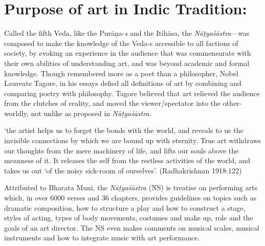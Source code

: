 \section*{Purpose of art in Indic Tradition:}

Called the fifth Veda, like the Purāṇa-\textsl{s} and the Itihāsa, the \textsl{Nāṭyaśāstra}---was composed to make the knowledge of the \hbox{Veda-s} accessible to all factions of society, by evoking an experience in the audience that was commensurate with their own abilities of understanding art, and was beyond academic and formal knowledge. Though remembered more as a poet than a philosopher, Nobel Laureate Tagore, in his essays defied all definitions of art by combining and comparing poetry with philosophy. Tagore believed that art relieved the audience from the clutches of reality, and moved the viewer/spectator into the other-worldly, not unlike as proposed in \textsl{Nāṭyaśāstra}. 

\begin{myquote}
‘the artist helps us to forget the bonds with the world, and reveals to us the invisible connections by which we are bound up with eternity. True art withdraws our thoughts from the mere machinery of life, and lifts our souls above the meanness of it. It releases the self from the restless activities of the world, and takes us out ‘of the noisy sick-room of ourselves’.
\hfill (Radhakrishnan 1918:122)
\end{myquote}

Attributed to Bharata Muni, the \textsl{Nāṭyaśāstra} (NS) is treatise on performing arts which, in over 6000 verses and 36 chapters, provides guidelines on topics such as dramatic composition, how to structure a play and how to construct a stage, styles of acting, types of body movements, costumes and make up, role and the goals of an art director. The NS even makes comments on musical scales, musical instruments and how to integrate music with art performance.

